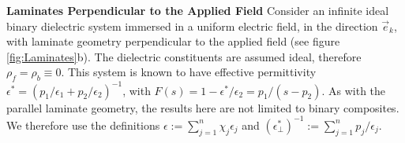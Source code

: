 \documentclass[english,12pt]{ttuthes}
\begin{document}
\vspace{0.1in}\noindent\textbf{Laminates Perpendicular to the Applied
  Field}\newline 
%
Consider an infinite ideal binary dielectric system immersed in a
uniform electric field, in the direction $\vec{e}_k$, with laminate
geometry perpendicular to the applied field (see figure
\ref{fig:Laminates}b). The dielectric constituents are assumed ideal,
therefore $\rho_f=\rho_b\equiv0$. This system is known \cite{Scaife-1989} to
have effective permittivity $\epsilon^*=(p_1/\epsilon_1+p_2/\epsilon_2)^{-1}$, with 
$F(s)=1-\epsilon^*/\epsilon_2=p_1/(s-p_2)$. As with the parallel laminate geometry,
the results here are not limited to binary composites. We therefore
use the definitions $\epsilon:=\sum_{j=1}^n \chi_j\epsilon_j$ and  $(\epsilon^*_\perp)^{-1}:=\sum_{j=1}^n p_j/\epsilon_j$. 
\end{document}
